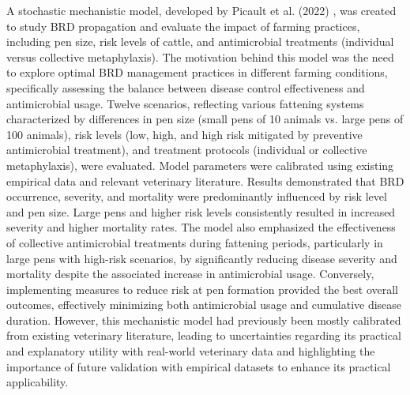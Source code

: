 
A stochastic mechanistic model, developed by Picault et al. (2022) \cite{picault_modelling_2022}, was created to study BRD propagation and evaluate the impact of farming practices, including pen size, risk levels of cattle, and antimicrobial treatments (individual versus collective metaphylaxis). The motivation behind this model was the need to explore optimal BRD management practices in different farming conditions, specifically assessing the balance between disease control effectiveness and antimicrobial usage. Twelve scenarios, reflecting various fattening systems characterized by differences in pen size (small pens of 10 animals vs. large pens of 100 animals), risk levels (low, high, and high risk mitigated by preventive antimicrobial treatment), and treatment protocols (individual or collective metaphylaxis), were evaluated. Model parameters were calibrated using existing empirical data and relevant veterinary literature. Results demonstrated that BRD occurrence, severity, and mortality were predominantly influenced by risk level and pen size. Large pens and higher risk levels consistently resulted in increased severity and higher mortality rates. The model also emphasized the effectiveness of collective antimicrobial treatments during fattening periods, particularly in large pens with high-risk scenarios, by significantly reducing disease severity and mortality despite the associated increase in antimicrobial usage. Conversely, implementing measures to reduce risk at pen formation provided the best overall outcomes, effectively minimizing both antimicrobial usage and cumulative disease duration. However, this mechanistic model had previously been mostly calibrated from existing veterinary literature, leading to uncertainties regarding its practical and explanatory utility with real-world veterinary data and highlighting the importance of future validation with empirical datasets to enhance its practical applicability.

